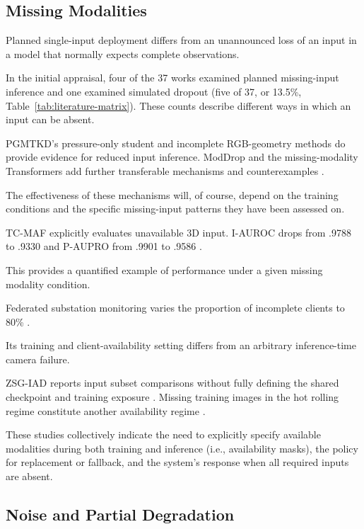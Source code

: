 \subsection{Missing Modalities}

Planned single-input deployment differs from an unannounced loss of an input in a model that
normally expects complete observations.

In the initial appraisal, four of the 37 works examined planned missing-input inference and one examined simulated dropout (five of 37, or 13.5\%, Table~\ref{tab:literature-matrix}). These counts describe different ways in which an input can be absent.

PGMTKD's pressure-only student and incomplete RGB-geometry methods do provide evidence for reduced
input inference. ModDrop and the missing-modality Transformers add further transferable mechanisms
and counterexamples \parencite{li_pgmtkd_2025,sui_incomplete_2026,neverova_moddrop_2015,ma_are_2022}.

The effectiveness of these mechanisms will, of course, depend on the training conditions and the
specific missing-input patterns they have been assessed on.

TC-MAF explicitly evaluates unavailable 3D input. I-AUROC drops from .9788 to .9330 and P-AUPRO from
.9901 to .9586 \parencite[Table~3]{deng_tc-maf_2026}.

This provides a quantified example of performance under a given missing modality condition.

Federated substation monitoring varies the proportion of incomplete clients to 80\% \parencite[Figure~8]{zhao_realtime_2026}.

Its training and client-availability setting differs from an arbitrary inference-time camera
failure.

ZSG-IAD reports input subset comparisons without fully defining the shared checkpoint and training
exposure \parencite{chen_zsg-iad_2026}. Missing training images in the hot rolling regime constitute another
availability regime \parencite{ma_multi-source_2025}.

These studies collectively indicate the need to explicitly specify available modalities during both
training and inference (i.e., availability masks), the policy for replacement or fallback, and the
system's response when all required inputs are absent.

\subsection{Noise and Partial Degradation}

